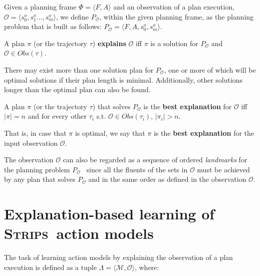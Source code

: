 \documentclass[runningheads]{llncs}
\newcommand{\tup}[1]{{\langle #1 \rangle}}
\newcommand{\strips}{\textsc{Strips}}     %
\begin{document}
Given a planning frame $\Phi=\tup{F,A}$ and an observation of a plan execution, $\mathcal{O}=\tup{s_0^o,s_1^o \ldots , s_m^o}$, we define $P_\mathcal{O}$, within the given planning frame, as the planning problem that is built as follows: $P_\mathcal{O}=\tup{F,A,s_0^o,s_m^o}$.



\begin{definition}[Explanation]
A plan $\pi$ (or the trajectory $\tau$) \textbf{explains} $\mathcal{O}$ iff $\pi$ is a solution for $P_\mathcal{O}$ and $\mathcal{O} \in Obs(\tau)$.
\end{definition}


There may exist more than one solution plan for $P_\mathcal{O}$, one or more of which will be optimal solutions if their plan length is minimal. Additionally, other solutions longer than the optimal plan can also be found.


\begin{definition}
A plan $\pi$ (or the trajectory $\tau$) that solves $P_\mathcal{O}$ is the \textbf{best explanation} for $\mathcal{O}$ iff $|\pi|=n$ and for every other $\tau_i$ s.t. $\mathcal{O} \in Obs(\tau_i)$, $|\pi_i|>n$.
\end{definition}

That is, in case that $\pi$ is optimal, we say that $\pi$ is the \textbf{best explanation} for the input observation $\mathcal{O}$.

The observation $\mathcal{O}$ can also be regarded as a sequence of ordered {\em landmarks} for the planning problem $P_\mathcal{O}$~\cite{hoffmann2004ordered} since all the fluents of the sets in $\mathcal{O}$ must be achieved by any plan that solves $P_\mathcal{O}$ and in the same order as defined in the observation $\mathcal{O}$.



\section{Explanation-based learning of \strips\ action models}
The task of learning action models by explaining the observation of a plan execution is defined as a tuple $\Lambda=\tup{\mathcal{M},{\mathcal O}}$, where:
\end{document}
